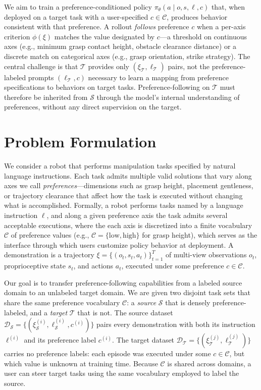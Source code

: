 \documentclass{article}
\begin{document}
We aim to train a preference-conditioned policy $\pi_{\theta}(a\mid o,s,\ell,c)$ that, when deployed on a target task with a user-specified $c\in\mathcal{C}$, produces behavior consistent with that preference.
A rollout \emph{follows} preference $c$ when a per-axis criterion $\phi(\xi)$ matches the value designated by $c$---a threshold on continuous axes (e.g., minimum grasp contact height, obstacle clearance distance) or a discrete match on categorical axes (e.g., grasp orientation, strike strategy).
The central challenge is that $\mathcal{T}$ provides only $(\xi_\mathcal{T},\ell_\mathcal{T})$ pairs, not the preference-labeled prompts $(\ell_\mathcal{T},c)$ necessary to learn a mapping from preference specifications to behaviors on target tasks.
Preference-following on $\mathcal{T}$ must therefore be inherited from $\mathcal{S}$ through the model's internal understanding of preferences, without any direct supervision on the target.



\section{Problem Formulation}
\label{sec:formulation}

We consider a robot that performs manipulation tasks specified by natural language instructions.
Each task admits multiple valid solutions that vary along axes we call \emph{preferences}---dimensions such as grasp height, placement gentleness, or trajectory clearance that affect how the task is executed without changing what is accomplished.
Formally, a robot performs tasks named by a language instruction $\ell$, and along a given preference axis the task admits several acceptable executions, where the each axis is discretized into a finite vocabulary $\mathcal{C}$ of preference values (e.g., $\mathcal{C}=\{\mathrm{low},\mathrm{high}\}$ for grasp height), which serves as the interface through which users customize policy behavior at deployment.
  A demonstration is a trajectory $\xi=\{(o_t,s_t,a_t)\}_{t=1}^{T}$ of multi-view observations $o_t$, proprioceptive state $s_t$, and actions $a_t$, executed under some preference $c\in\mathcal{C}$.


Our goal is to transfer preference-following capabilities from a labeled source domain to an unlabeled target domain.
We are given two disjoint task sets that share the same preference vocabulary $\mathcal{C}$: a \emph{source} $\mathcal{S}$ that is densely preference-labeled, and a \emph{target} $\mathcal{T}$ that is not.
The source dataset $\mathcal{D}_{\mathcal{S}}=\{(\xi_{\mathcal{S}}^{(i)},\ell_{\mathcal{S}}^{(i)},c^{(i)})\}$ pairs every demonstration with both its instruction $\ell^{(i)}$ and its preference label $c^{(i)}$.
The target dataset $\mathcal{D}_{\mathcal{T}}=\{(\xi_{\mathcal{T}}^{(j)},\ell_{\mathcal{T}}^{(j)})\}$ carries no preference labels: each episode was executed under some $c\in\mathcal{C}$, but which value is unknown at training time.
Because $\mathcal{C}$ is shared across domains, a user can steer target tasks using the same vocabulary employed to label the source.
\end{document}
